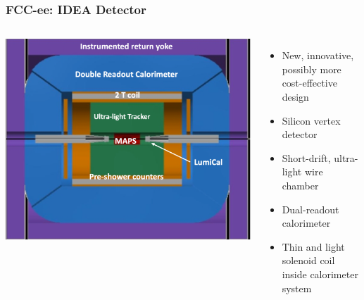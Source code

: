 \documentclass{beamer}
\begin{document}
\begin{frame}
  \frametitle{FCC-ee: IDEA Detector}

  \begin{columns}[c]
    \includegraphics[width=\linewidth]{figures/FCC_ee_IDEA.png}%

    \begin{itemize}
      \item New, innovative, possibly more cost-effective design
      \item Silicon vertex detector
      \item Short-drift, ultra-light wire chamber
      \item Dual-readout calorimeter
      \item Thin and light solenoid coil inside calorimeter system
    \end{itemize}
  \end{columns}
\end{frame}
\end{document}
